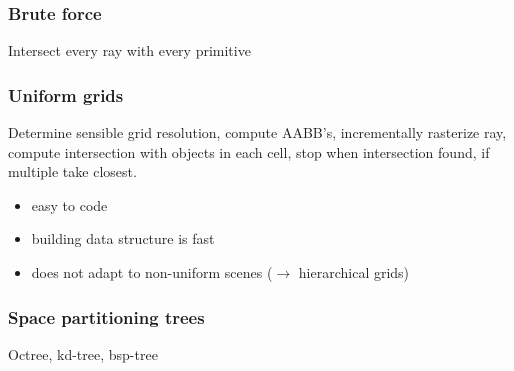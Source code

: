 \documentclass[a4paper,10pt]{article}
\newcommand*\good{\item[\textcolor{goodgreen}{\(\bm{+}\)}]}
\newcommand*\bad{\item[\textcolor{badred}{\(\bm{-}\)}]}
\begin{document}
\subsubsection{Brute force} Intersect every ray with every primitive
\subsubsection{Uniform grids} Determine sensible grid resolution, compute AABB's, incrementally rasterize ray, compute intersection with objects in each cell, stop when intersection found, if multiple take closest.
\begin{itemize}
    \good easy to code
    \good building data structure is fast
    \bad does not adapt to non-uniform scenes (\( \to  \) hierarchical grids)
\end{itemize}
\subsubsection{Space partitioning trees} Octree, kd-tree, bsp-tree
\end{document}

